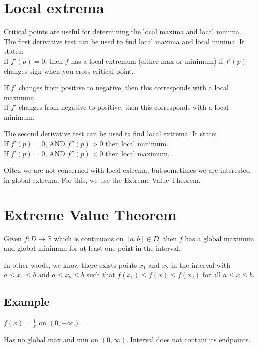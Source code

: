 \section{Local extrema}
Critical points are useful for determining the local maxima and local minima.
The first derivative test can be used to find local maxima and local minima. It
states: \\
If $f'(p) = 0$, then $f$ has a local extremum (either max or minimum) if $f'(p)$
changes sign when you cross critical point.

If $f'$ changes from positive to negative, then this corresponds with a local
maximum. \\
If $f'$ changes from negative to positive, then this corresponds with a local
minimum.

The second derivative test can be used to find local extrema. It state: \\
If $f'(p) = 0$, AND $f''(p) > 0$ then local minimum. \\
If $f'(p) = 0$, AND $f''(p) < 0$ then local maximum.

Often we are not concerned with local extrema, but sometimes we are interested
in global extrema. For this, we use the Extreme Value Theorem.

\section{Extreme Value Theorem}
Given $f: D \to \mathbb{R}$ which is continuous on $[a,b] \in D$, then $f$ has a
global maximum and global minimum for at least one point in the interval.

In other words, we know there exists points $x_1$ and $x_2$ in the interval with
$a \leq x_1 \leq b$ and $a \leq x_2 \leq b$ such that
$f(x_1) \leq f(x) \leq f(x_2)$ for all $a \leq x \leq b$.

\subsection{Example}
$f(x) = \frac{1}{x}$ on $(0, +\infty)$...


Has no global max and min on $(0, \infty)$. Interval does not contain its
endpoints.

